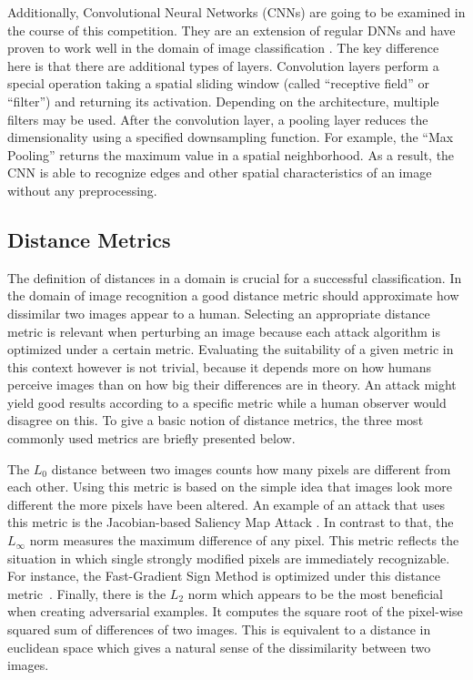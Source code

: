 Additionally, Convolutional Neural Networks (CNNs) are going to be examined in the course of this competition.
They are an extension of regular DNNs and have proven to work well in the domain of image classification \cite{matsugu2003subject, krizhevsky2012imagenet}.
The key difference here is that there are additional types of layers.
Convolution layers perform a special operation taking a spatial sliding window (called \enquote{receptive field} or \enquote{filter}) and returning its activation.
Depending on the architecture, multiple filters may be used.
After the convolution layer, a pooling layer reduces the dimensionality using a specified downsampling function.
For example, the \enquote{Max Pooling} returns the maximum value in a spatial neighborhood.
As a result, the CNN is able to recognize edges and other spatial characteristics of an image without any preprocessing.

\subsection{Distance Metrics}\label{subsec:metrics}
The definition of distances in a domain is crucial for a successful classification.
In the domain of image recognition a good distance metric should approximate how dissimilar two images appear to a human.
Selecting an appropriate distance metric is relevant when perturbing an image because each attack algorithm is optimized under a certain metric.
Evaluating the suitability of a given metric in this context however is not trivial, because it depends more on how humans perceive images than on how big their differences are in theory.
An attack might yield good results according to a specific metric while a human observer would disagree on this.
To give a basic notion of distance metrics, the three most commonly used metrics are briefly presented below.

The $L_0$ distance between two images counts how many pixels are different from each other.
Using this metric is based on the simple idea that images look more different the more pixels have been altered.
An example of an attack that uses this metric is the Jacobian-based Saliency Map Attack \cite{papernot2016limitations}.
In contrast to that, the $L_\infty$ norm measures the maximum difference of any pixel.
This metric reflects the situation in which single strongly modified pixels are immediately recognizable.
For instance, the Fast-Gradient Sign Method is optimized under this distance metric~\cite{szegedy2015explaining}.
Finally, there is the $L_2$ norm which appears to be the most beneficial when creating adversarial examples.
It computes the square root of the pixel-wise squared sum of differences of two images.
This is equivalent to a distance in euclidean space which gives a natural sense of the dissimilarity between two images.

